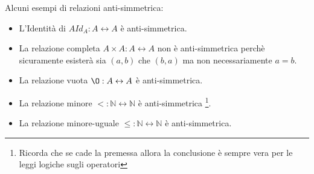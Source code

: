 \begin{example}
Alcuni esempi di relazioni anti-simmetrica:
    \begin{itemize}
        \item L'Identità di $A Id_A: A \leftrightarrow A$ è anti-simmetrica.
        \item La relazione completa $A \times A:A \leftrightarrow A$ non è anti-simmetrica perchè sicuramente esisterà sia $(a,b)$ che $(b,a)$ ma non necessariamente $a = b$.
        \item La relazione vuota $\O: A \leftrightarrow A$ è anti-simmetrica.
        \item La relazione minore $<: \mathbb{N} \leftrightarrow \mathbb{N}$ è anti-simmetrica \footnote{Ricorda che se cade la premessa allora la conclusione è sempre vera per le leggi logiche sugli operatori}.
        \item La relazione minore-uguale $\leq: \mathbb{N} \leftrightarrow \mathbb{N}$ è anti-simmetrica.
    \end{itemize}
\end{example}

